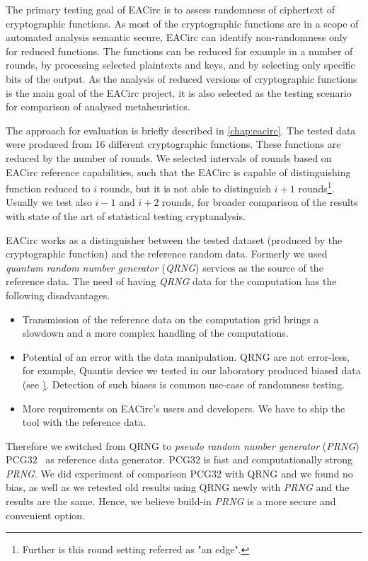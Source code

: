 \documentclass[
    digital,    %
    oneside,    %
    color,
    11pt,
    nocover,
    notable,
    nolof,
    nolot,
]{fithesis3}
\begin{document}
The primary testing goal of EACirc is to assess randomness of ciphertext of cryptographic functions. As most of the cryptographic functions are in a scope of automated analysis semantic secure, EACirc can identify non-randomness only for reduced functions. The functions can be reduced for example in a number of rounds, by processing selected plaintexts and keys, and by selecting only specific bits of the output. As the analysis of reduced versions of cryptographic functions is the main goal of the EACirc project, it is also selected as the testing scenario for comparison of analysed metaheuristics.

The approach for evaluation is briefly described in \cref{chap:eacirc}. The tested data were produced from 16 different cryptographic functions. These functions are reduced by the number of rounds. We selected intervals of rounds based on EACirc reference capabilities, such that the EACirc is capable of distinguishing function reduced to $i$ rounds, but it is not able to distinguish $i+1$ rounds\footnote{Further is this round setting referred as "an edge".}. Usually we test also $i-1$ and $i+2$ rounds, for broader comparison of the results with state of the art of statistical testing cryptanalysis.

EACirc works as a distinguisher between the tested dataset (produced by the cryptographic function) and the reference random data. Formerly we used \textit{quantum random number generator} (\textit{QRNG}) services as the source of the reference data. The need of having \textit{QRNG} data for the computation has the following disadvantages.

\begin{itemize}
    \item Transmission of the reference data on the computation grid brings a slowdown and a more complex handling of the computations.
    \item Potential of an error with the data manipulation. QRNG are not error-less, for example, Quantis device we tested in our laboratory produced biased data (see \href{http://rtt.ics.muni.cz/ViewResults/Experiment/1732/}). Detection of such biases is common use-case of randomness testing.
    \item More requirements on EACirc's users and developers. We have to ship the tool with the reference data.
\end{itemize}

Therefore we switched from QRNG to \textit{pseudo random number generator} (\textit{PRNG}) PCG32~\cite{pcgGen} as reference data generator. PCG32 is fast and computationally strong \textit{PRNG}. We did experiment of comparison PCG32 with QRNG and we found no bias, as well as we retested old results using QRNG newly with \textit{PRNG} and the results are the same. Hence, we believe build-in \textit{PRNG} is a more secure and convenient option.
\end{document}
